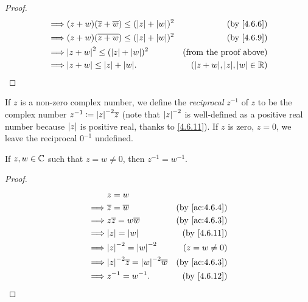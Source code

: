 \begin{proof}
\begin{align*}
    \implies & (z + w) (\overline{z} + \overline{w}) \leq (\abs{z} + \abs{w})^2                                       & \text{(by \cref{4.6.6})}               \\
    \implies & (z + w) (\overline{z + w}) \leq (\abs{z} + \abs{w})^2                                                  & \text{(by \cref{4.6.9})}               \\
    \implies & \abs{z + w}^2 \leq (\abs{z} + \abs{w})^2                                                               & \text{(from the proof above)}          \\
    \implies & \abs{z + w} \leq \abs{z} + \abs{w}.                                                                    & (\abs{z + w}, \abs{z}, \abs{w} \in \R)
  \end{align*}
\end{proof}

\begin{defn}\label{4.6.12}
  If \(z\) is a non-zero complex number, we define the \emph{reciprocal} \(z^{-1}\) of \(z\) to be the complex number \(z^{-1} \coloneqq \abs{z}^{-2} \overline{z}\)
  (note that \(\left\lvert z\right\rvert^{-2}\) is well-defined as a positive real number because \(\left\lvert z\right\rvert\) is positive real, thanks to \cref{4.6.11}).
  If \(z\) is zero, \(z = 0\), we leave the reciprocal \(0^{-1}\) undefined.
\end{defn}

\begin{ac}\label{ac:4.6.5}
  If \(z, w \in \mathbb{C}\) such that \(z = w \neq 0\), then \(z^{-1} = w^{-1}\).
\end{ac}

\begin{proof}
  \begin{align*}
             & z = w                                                                               \\
    \implies & \overline{z} = \overline{w}                           & \text{(by \cref{ac:4.6.4})} \\
    \implies & z \overline{z} = w \overline{w}                       & \text{(by \cref{ac:4.6.3})} \\
    \implies & \abs{z} = \abs{w}                                     & \text{(by \cref{4.6.11})}   \\
    \implies & \abs{z}^{-2} = \abs{w}^{-2}                           & (z = w \neq 0)              \\
    \implies & \abs{z}^{-2} \overline{z} = \abs{w}^{-2} \overline{w} & \text{(by \cref{ac:4.6.3})} \\
    \implies & z^{-1} = w^{-1}.                                      & \text{(by \cref{4.6.12})}
  \end{align*}
\end{proof}

